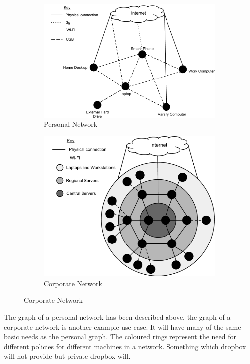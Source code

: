 \documentclass[12pt]{article}
\begin{document}
\begin{figure}[htp]
    \begin{subfigure}[b]{0.5\textwidth}
        \centering
        \includegraphics[scale=0.35]{images/PersonalGraph.png}
        \caption{Personal Network}
        \label{fig:personal_graph}
    \end{subfigure}
    \begin{subfigure}[b]{0.5\textwidth}
        \includegraphics[scale=0.35]{images/CorporateGraph.png}
        \caption{Corporate Network}
        \label{fig:corp_graph}
    \end{subfigure}
\end{figure}

The graph of a personal network has been described above, 
the graph of a  corporate network
is another example use case. It will have many of the same
basic needs as the personal graph. The coloured rings represent
the need for different policies for different machines in a network.
Something which dropbox will not provide but private dropbox will.
\end{document}
